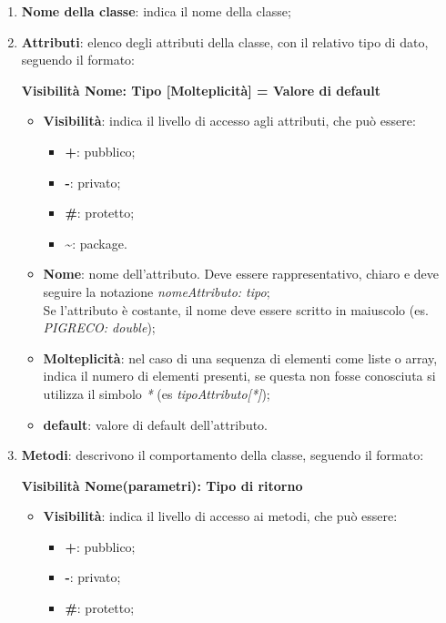 \begin{enumerate}
	\item \textbf{Nome della classe}: indica il nome della classe;
	\item \textbf{Attributi}: elenco degli attributi della classe, con il relativo tipo di dato, seguendo il formato: \\ \begin{center}\textbf{Visibilità Nome: Tipo [Molteplicità] = Valore di default}\end{center}
	\begin{itemize}
		\item \textbf{Visibilità}: indica il livello di accesso agli attributi, che può essere:
		\begin{itemize}
			\item \textbf{+}: pubblico;
			\item \textbf{-}: privato;
			\item \textbf{\#}: protetto;
			\item \textbf{\textasciitilde}: package.
		\end{itemize}
		\item \textbf{Nome}: nome dell'attributo. Deve essere rappresentativo, chiaro e deve seguire la notazione \textit{nomeAttributo: tipo}; \\ Se l'attributo è costante, il nome deve essere scritto in maiuscolo (es. \textit{PIGRECO: double});
		\item \textbf{Molteplicità}: nel caso di una sequenza di elementi come liste o array, indica il numero di elementi presenti, se questa non fosse conosciuta si utilizza il simbolo \textit{*} (es \textit{tipoAttributo[*]});
		\item \textbf{default}: valore di default dell'attributo.
	\end{itemize}
	\item \textbf{Metodi}: descrivono il comportamento della classe, seguendo il formato: \\ \begin{center}\textbf{Visibilità Nome(parametri): Tipo di ritorno}\end{center}
	\begin{itemize}
		\item \textbf{Visibilità}: indica il livello di accesso ai metodi, che può essere:
		\begin{itemize}
			\item \textbf{+}: pubblico;
			\item \textbf{-}: privato;
			\item \textbf{\#}: protetto;

\end{itemize}
\end{itemize}
\end{enumerate}
